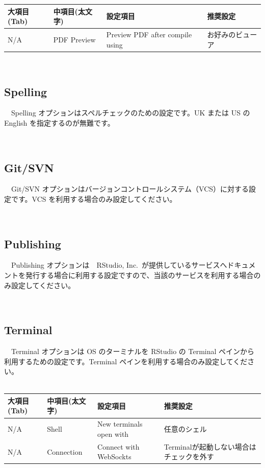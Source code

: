 \documentclass[
  12pt,
]{book}
\begin{document}
\begin{longtable}[]{@{}llll@{}}
\toprule
大項目(Tab) & 中項目(太文字) & 設定項目 & 推奨設定 \\
\midrule
\endhead
N/A & PDF Preview & Preview PDF after compile using & お好みのビューア \\
\bottomrule
\end{longtable}

　

\hypertarget{spelling}{%
\subsection{Spelling}\label{spelling}}

　Spelling オプションはスペルチェックのための設定です。UK または US の English を指定するのが無難です。

　

\hypertarget{gitsvn}{%
\subsection{Git/SVN}\label{gitsvn}}

　Git/SVN オプションはバージョンコントロールシステム（VCS）に対する設定です。VCS を利用する場合のみ設定してください。

　

\hypertarget{publishing}{%
\subsection{Publishing}\label{publishing}}

　Publishing オプションは　RStudio, Inc.~が提供しているサービスへドキュメントを発行する場合に利用する設定ですので、当該のサービスを利用する場合のみ設定してください。

　

\hypertarget{terminal}{%
\subsection{Terminal}\label{terminal}}

　Terminal オプションは OS のターミナルを RStudio の Terminal ペインから利用するための設定です。Terminal ペインを利用する場合のみ設定してください。\\
　

\begin{longtable}[]{@{}llll@{}}
\toprule
大項目(Tab) & 中項目(太文字) & 設定項目 & 推奨設定 \\
\midrule
\endhead
N/A & Shell & New terminals open with & 任意のシェル \\
N/A & Connection & Connect with WebSockts & Terminalが起動しない場合はチェックを外す \\
\bottomrule
\end{longtable}
\end{document}
